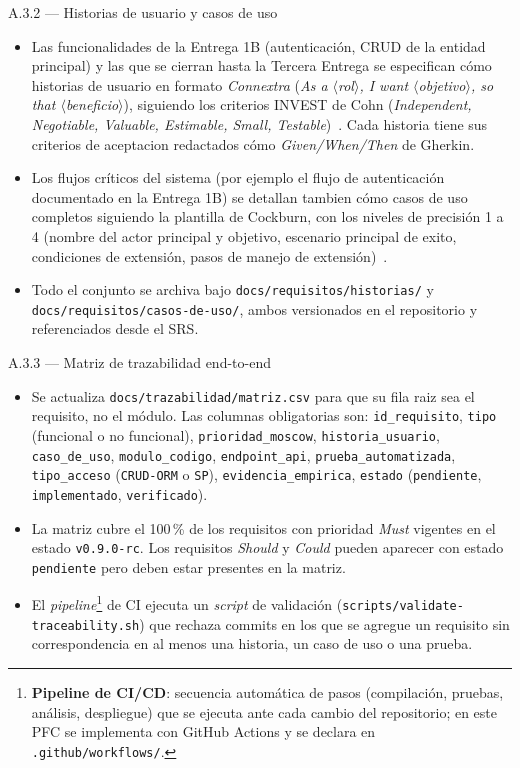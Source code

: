 \documentclass[11pt,a4paper]{article}
\begin{document}
\begin{cajaentregable}{A.3.2 --- Historias de usuario y casos de uso}
    \begin{itemize}
        \item Las funcionalidades de la Entrega 1B (autenticaci\'{o}n, CRUD de la entidad principal) y las que se cierran hasta la Tercera Entrega se especifican c\'{o}mo historias de usuario en formato \emph{Connextra} (\textit{As a $\langle$rol$\rangle$, I want $\langle$objetivo$\rangle$, so that $\langle$beneficio$\rangle$}), siguiendo los criterios INVEST de Cohn (\emph{Independent, Negotiable, Valuable, Estimable, Small, Testable})~\cite{cohn2004user}. Cada historia tiene sus criterios de aceptacion redactados c\'{o}mo \emph{Given/When/Then} de Gherkin.
        \item Los flujos cr\'{i}ticos del sistema (por ejemplo el flujo de autenticaci\'{o}n documentado en la Entrega 1B) se detallan tambien c\'{o}mo casos de uso completos siguiendo la plantilla de Cockburn, con los niveles de precisi\'{o}n 1 a 4 (nombre del actor principal y objetivo, escenario principal de exito, condiciones de extensi\'{o}n, pasos de manejo de extensi\'{o}n)~\cite{cockburn2001writing}.
        \item Todo el conjunto se archiva bajo \texttt{docs/requisitos/historias/} y \texttt{docs/requisitos/casos-de-uso/}, ambos versionados en el repositorio y referenciados desde el SRS.
    \end{itemize}
\end{cajaentregable}

\begin{cajaentregable}{A.3.3 --- Matriz de trazabilidad end-to-end}
    \begin{itemize}
        \item Se actualiza \texttt{docs/trazabilidad/matriz.csv} para que su fila raiz sea el requisito, no el m\'{o}dulo. Las columnas obligatorias son: \texttt{id\_requisito}, \texttt{tipo} (funcional o no funcional), \texttt{prioridad\_moscow}, \texttt{historia\_usuario}, \texttt{caso\_de\_uso}, \texttt{modulo\_codigo}, \texttt{endpoint\_api}, \texttt{prueba\_automatizada}, \texttt{tipo\_acceso} (\texttt{CRUD-ORM} o \texttt{SP}), \texttt{evidencia\_empirica}, \texttt{estado} (\texttt{pendiente}, \texttt{implementado}, \texttt{verificado}).
        \item La matriz cubre el 100\,\% de los requisitos con prioridad \emph{Must} vigentes en el estado \texttt{v0.9.0-rc}. Los requisitos \emph{Should} y \emph{Could} pueden aparecer con estado \texttt{pendiente} pero deben estar presentes en la matriz.
        \item El \emph{pipeline}\footnote{\textbf{Pipeline de CI/CD}: secuencia autom\'{a}tica de pasos (compilaci\'{o}n, pruebas, an\'{a}lisis, despliegue) que se ejecuta ante cada cambio del repositorio; en este PFC se implementa con GitHub Actions y se declara en \texttt{.github/workflows/}.} de CI ejecuta un \emph{script} de validaci\'{o}n (\texttt{scripts/validate-traceability.sh}) que rechaza commits en los que se agregue un requisito sin correspondencia en al menos una historia, un caso de uso o una prueba.
    \end{itemize}
\end{cajaentregable}
\end{document}
